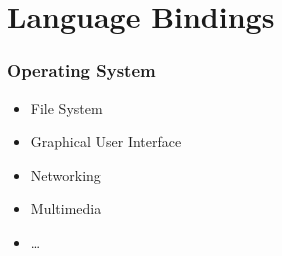 \section{Language Bindings}

\frame{\tableofcontents[currentsection]}

\begin{frame}
  \frametitle{Operating System}
  \begin{itemize}
    \item File System
    \item Graphical User Interface
    \item Networking
    \item Multimedia
    \item \dots
  \end{itemize}
\end{frame}

